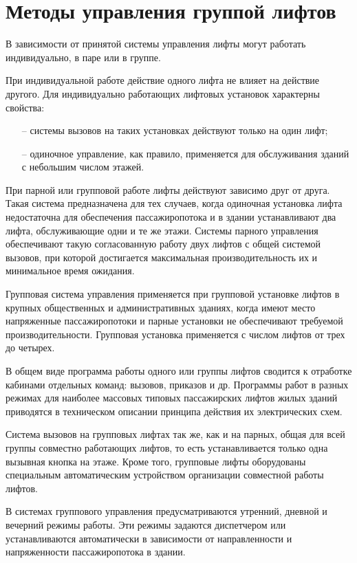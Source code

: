 \section{Методы управления группой лифтов}

	В зависимости от принятой системы управления лифты могут работать индивидуально, в паре или в группе. 

	При индивидуальной работе действие одного лифта не влияет на действие другого.
		Для индивидуально работающих лифтовых установок характерны свойства:
		\begin{itemize}
			\item[--] системы вызовов на таких установках действуют только на один лифт;
			\item[--] одиночное управление, как правило, применяется для обслуживания зданий с небольшим числом этажей.
		\end{itemize}

	При парной или групповой работе лифты действуют зависимо друг от друга.
		Такая система предназначена для тех случаев, когда одиночная установка лифта недостаточна
		для обеспечения пассажиропотока и в здании устанавливают два лифта, обслуживающие одни и те же этажи.
		Системы парного управления обеспечивают такую согласованную работу двух лифтов с общей системой вызовов,
		при которой достигается максимальная производительность их и минимальное время ожидания.

	Групповая система управления применяется при групповой установке лифтов в крупных
		общественных и административных зданиях, когда имеют место напряженные
		пассажиропотоки и парные установки не обеспечивают требуемой производительности.
		Групповая установка применяется с числом лифтов от трех до четырех.

	В общем виде программа работы одного или группы лифтов сводится к отработке кабинами отдельных команд:
		вызовов, приказов и др. Программы работ в разных режимах для наиболее массовых
		типовых пассажирских лифтов жилых зданий приводятся в техническом описании принципа
		действия их электрических схем.

	Система вызовов на групповых лифтах так же, как и на парных,
		общая для всей группы совместно работающих лифтов, то есть устанавливается только одна
		вызывная кнопка на этаже. Кроме того, групповые лифты оборудованы специальным автоматическим
		устройством организации совместной работы лифтов. 

	В системах группового управления предусматриваются утренний,
		дневной и вечерний режимы работы. Эти режимы задаются диспетчером
		или устанавливаются автоматически в зависимости от направленности и напряженности пассажиропотока в здании.
